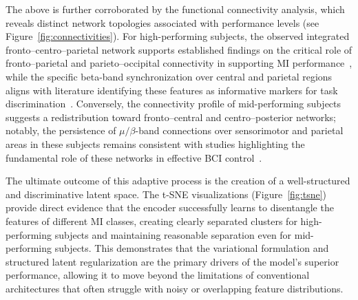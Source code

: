 {{The above is further corroborated by the functional connectivity analysis, which reveals distinct network topologies associated with performance levels (see Figure~\ref{fig:connectivities}). For high-performing subjects, the observed integrated fronto--centro--parietal network supports established findings on the critical role of fronto--parietal and parieto--occipital connectivity in supporting MI performance~\cite{Hamedi2016MIBrainConnectivityReview}, while the specific beta-band synchronization over central and parietal regions aligns with literature identifying these features as informative markers for task discrimination~\cite{cardoso2021pedalingMI}. Conversely, the connectivity profile of mid-performing subjects suggests a redistribution toward fronto--central and centro--posterior networks; notably, the persistence of $\mu/\beta$-band connections over sensorimotor and parietal areas in these subjects remains consistent with studies highlighting the fundamental role of these networks in effective BCI control~\cite{CaicedoAcosta2021DeepNeuralRegression,Vidaurre2020SensorimotorFC}.

The ultimate outcome of this adaptive process is the creation of a well-structured and discriminative latent space. The t-SNE visualizations (Figure~\ref{fig:tsne}) provide direct evidence that the encoder successfully learns to disentangle the features of different MI classes, creating clearly separated clusters for high-performing subjects and maintaining reasonable separation even for mid-performing subjects. This demonstrates that the variational formulation and structured latent regularization are the primary drivers of the model's superior performance, allowing it to move beyond the limitations of conventional architectures that often struggle with noisy or overlapping feature distributions.

}}
